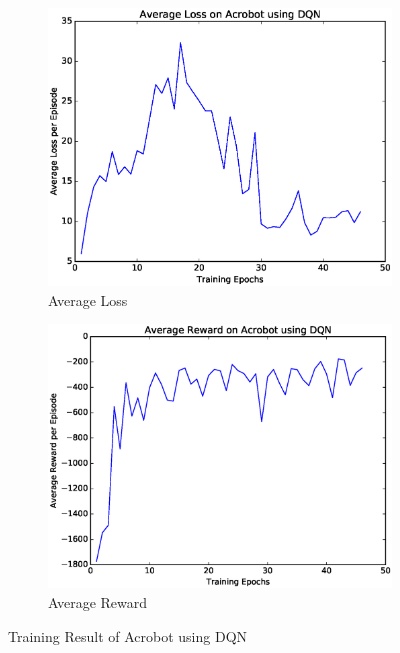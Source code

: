 \documentclass[a4paper,UTF8]{article}
\theoremstyle{definition}
\begin{document}
\begin{figure}[H]
	\centering
	\begin{subfigure}[t]{0.5\textwidth}
		\centering
		\includegraphics[scale=0.35]{figures/bot-dqn-loss}
		\caption{Average Loss}
	\end{subfigure}%
	\begin{subfigure}[t]{0.5\textwidth}
		\centering
		\includegraphics[scale=0.35]{figures/bot-dqn-reward}
		\caption{Average Reward}
	\end{subfigure}
	\caption{Training Result of Acrobot using DQN}\label{fig:bot-dqn}
\end{figure}
\end{document}
